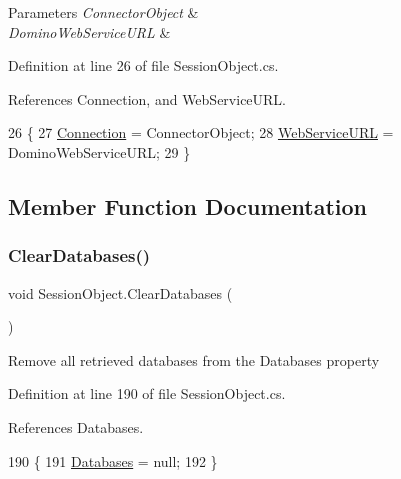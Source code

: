 \begin{DoxyParams}{Parameters}
{\em Connector\+Object} & \\
\hline
{\em Domino\+Web\+Service\+U\+RL} & \\
\hline
\end{DoxyParams}


Definition at line 26 of file Session\+Object.\+cs.



References Connection, and Web\+Service\+U\+RL.


\begin{DoxyCode}
26                                                                                 \{
27         \mbox{\hyperlink{class_session_object_a014bdbf705a753540e19bfb53030c55c}{Connection}} = ConnectorObject;
28         \mbox{\hyperlink{class_session_object_a697c071c812fbf7ad1166b896fb44c16}{WebServiceURL}} = DominoWebServiceURL;
29     \}
\end{DoxyCode}


\subsection{Member Function Documentation}
\mbox{\label{class_session_object_a7a13510147dc63acd76f3015b6f8e409}} 
\subsubsection{\texorpdfstring{Clear\+Databases()}{ClearDatabases()}}
{\footnotesize\ttfamily void Session\+Object.\+Clear\+Databases (\begin{DoxyParamCaption}{ }\end{DoxyParamCaption})}



Remove all retrieved databases from the \textquotesingle{}Databases\textquotesingle{} property 



Definition at line 190 of file Session\+Object.\+cs.



References Databases.


\begin{DoxyCode}
190                                  \{
191         \mbox{\hyperlink{class_session_object_aa0b75f5b9d0a6325f436e08db27204a2}{Databases}} = null;
192     \}
\end{DoxyCode}
\mbox{\label{class_session_object_ae1dc8cf45f981c629d0f77fbff04ae66}} 

